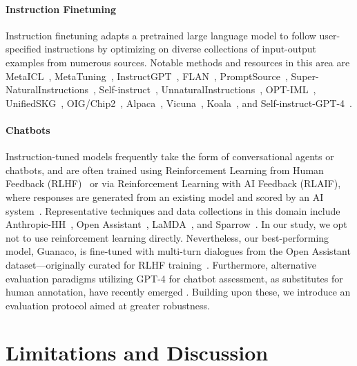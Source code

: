 \paragraph{Instruction Finetuning} Instruction finetuning adapts a pretrained large language model to follow user-specified instructions by optimizing on diverse collections of input-output examples from numerous sources. Notable methods and resources in this area are MetaICL~\citep{min2021metaicl}, MetaTuning~\citep{zhong2021adapting}, InstructGPT~\citep{ouyang2022training}, FLAN~\citep{wei2021finetuned,chung2022scaling}, PromptSource~\citep{bach2022promptsource}, Super-NaturalInstructions~\citep{wang2022super,sanh2021multitask}, Self-instruct~\citep{wang2022self}, UnnaturalInstructions~\citep{honovich2022unnatural}, OPT-IML~\citep{iyer2022opt}, UnifiedSKG~\citep{xie2022unifiedskg}, OIG/Chip2~\citep{laion2023}, Alpaca~\citep{alpaca}, Vicuna~\citep{vicuna2023}, Koala~\citep{koala_blogpost_2023}, and Self-instruct-GPT-4~\citep{peng2023instruction}.

\paragraph{Chatbots} Instruction-tuned models frequently take the form of conversational agents or chatbots, and are often trained using Reinforcement Learning from Human Feedback (RLHF)~\citep{christiano2017deep} or via Reinforcement Learning with AI Feedback (RLAIF), where responses are generated from an existing model and scored by an AI system~\citep{bai2022constitutional}. Representative techniques and data collections in this domain include Anthropic-HH~\citep{askell2021general,bai2022training}, Open Assistant~\citep{kopf2023openassistant}, LaMDA~\citep{thoppilan2022lamda}, and Sparrow~\citep{glaese2022improving}. In our study, we opt not to use reinforcement learning directly. Nevertheless, our best-performing model, Guanaco, is fine-tuned with multi-turn dialogues from the Open Assistant dataset—originally curated for RLHF training~\citep{kopf2023openassistant}. Furthermore, alternative evaluation paradigms utilizing GPT-4 for chatbot assessment, as substitutes for human annotation, have recently emerged \citep{vicuna2023,peng2023instruction}. Building upon these, we introduce an evaluation protocol aimed at greater robustness.

\section{Limitations and Discussion}

